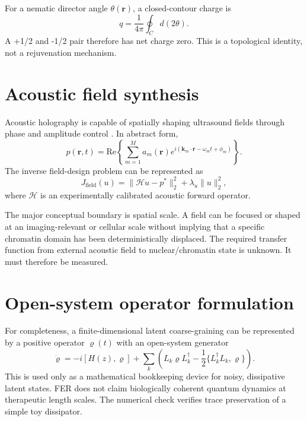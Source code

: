 \documentclass[11pt]{article}
\begin{document}
For a nematic director angle $\theta(\mathbf r)$, a closed-contour charge is
\begin{equation}
 q=\frac{1}{4\pi}\oint_C d(2\theta).
\label{eq:nematiccharge}
\end{equation}
A +1/2 and -1/2 pair therefore has net charge zero. This is a topological identity, not a rejuvenation mechanism.

\section{Acoustic field synthesis}
Acoustic holography is capable of spatially shaping ultrasound fields through phase and amplitude control \cite{burstow2025,fujita2026}. In abstract form,
\begin{equation}
 p(\mathbf r,t)=\mathrm{Re}\left\{\sum_{m=1}^{M}a_m(\mathbf r)e^{i(\mathbf k_m\cdot\mathbf r-\omega_m t+\phi_m)}\right\}.
\label{eq:acoustic}
\end{equation}
The inverse field-design problem can be represented as
\begin{equation}
 J_{\mathrm{field}}(u)=\|\mathcal H u-p^*\|_2^2+\lambda_u\|u\|_2^2,
\label{eq:fieldobjective}
\end{equation}
where $\mathcal H$ is an experimentally calibrated acoustic forward operator.

The major conceptual boundary is spatial scale. A field can be focused or shaped at an imaging-relevant or cellular scale without implying that a specific chromatin domain has been deterministically displaced. The required transfer function from external acoustic field to nuclear/chromatin state is unknown. It must therefore be measured.

\section{Open-system operator formulation}
For completeness, a finite-dimensional latent coarse-graining can be represented by a positive operator $\varrho(t)$ with an open-system generator
\begin{equation}
 \dot\varrho=-i[H(z),\varrho]+\sum_k\left(L_k\varrho L_k^\dagger-\frac12\{L_k^\dagger L_k,\varrho\}\right).
\label{eq:lindblad}
\end{equation}
This is used only as a mathematical bookkeeping device for noisy, dissipative latent states. FER does not claim biologically coherent quantum dynamics at therapeutic length scales. The numerical check verifies trace preservation of a simple toy dissipator.
\end{document}

